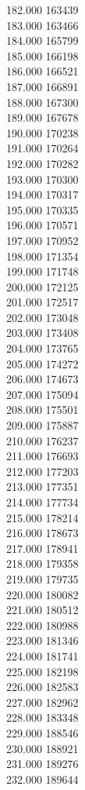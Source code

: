 { 182.000	163439 \\
 183.000	163466 \\
 184.000	165799 \\
 185.000	166198 \\
 186.000	166521 \\
 187.000	166891 \\
 188.000	167300 \\
 189.000	167678 \\
 190.000	170238 \\
 191.000	170264 \\
 192.000	170282 \\
 193.000	170300 \\
 194.000	170317 \\
 195.000	170335 \\
 196.000	170571 \\
 197.000	170952 \\
 198.000	171354 \\
 199.000	171748 \\
 200.000	172125 \\
 201.000	172517 \\
 202.000	173048 \\
 203.000	173408 \\
 204.000	173765 \\
 205.000	174272 \\
 206.000	174673 \\
 207.000	175094 \\
 208.000	175501 \\
 209.000	175887 \\
 210.000	176237 \\
 211.000	176693 \\
 212.000	177203 \\
 213.000	177351 \\
 214.000	177734 \\
 215.000	178214 \\
 216.000	178673 \\
 217.000	178941 \\
 218.000	179358 \\
 219.000	179735 \\
 220.000	180082 \\
 221.000	180512 \\
 222.000	180988 \\
 223.000	181346 \\
 224.000	181741 \\
 225.000	182198 \\
 226.000	182583 \\
 227.000	182962 \\
 228.000	183348 \\
 229.000	188546 \\
 230.000	188921 \\
 231.000	189276 \\
 232.000	189644 \\
}

